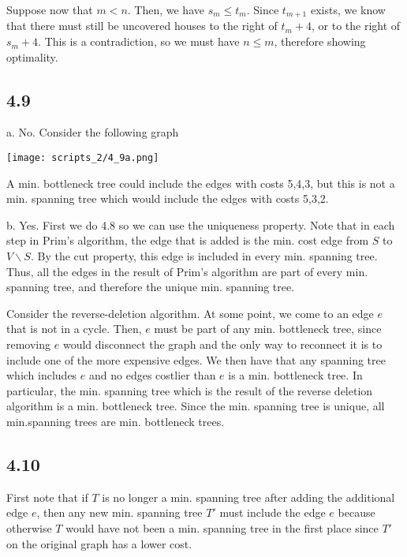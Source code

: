 \documentclass{article}
\begin{document}
Suppose now that $m<n$. Then, we have $s_m\leq t_m$. Since $t_{m+1}$ exists, we know that there must still be uncovered houses to the right of $t_m+4$, or to the right of $s_m+4$. This is a contradiction, so we must have $n\leq m$, therefore showing optimality.
\subsection*{4.9}
a. No. Consider the following graph

\texttt{[image: scripts\_2/4\_9a.png]}

A min. bottleneck tree could include the edges with costs 5,4,3, but this is not a min. spanning tree which would include the edges with costs 5,3,2.

b. Yes. First we do 4.8 so we can use the uniqueness property. Note that in each step in Prim's algorithm, the edge that is added is the min. cost edge from $S$ to $V\backslash S$. By the cut property, this edge is included in every min. spanning tree. Thus, all the edges in the result of Prim's algorithm are part of every min. spanning tree, and therefore the unique  min. spanning tree.

Consider the reverse-deletion algorithm. At some point, we come to an edge $e$ that is not in a cycle. Then, $e$ must be part of any min. bottleneck tree, since removing $e$ would disconnect the graph and the only way to reconnect it is to include one of the more expensive edges. We then have that any spanning tree which includes $e$ and no edges costlier than $e$ is a min. bottleneck tree. In particular, the min. spanning tree which is the result of the reverse deletion algorithm is a min. bottleneck tree. Since the min. spanning tree is unique, all min.spanning trees are min. bottleneck trees.
\subsection*{4.10}
First note that if $T$ is no longer a min. spanning tree after adding the additional edge $e$, then any new min. spanning tree $T'$ must include the edge $e$ because otherwise $T$ would have not been a min. spanning tree in the first place since $T'$ on the original graph has a lower cost.
\end{document}
